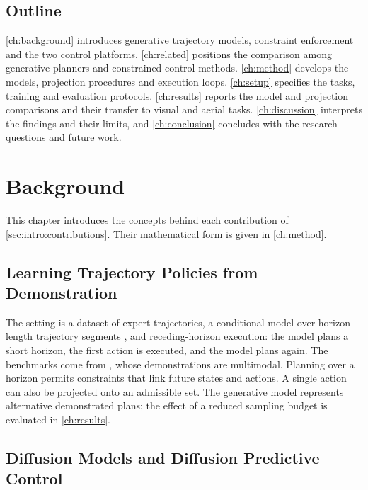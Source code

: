 \documentclass[headsepline,footsepline,footinclude=false,oneside,fontsize=11pt,paper=a4,listof=totoc,bibliography=totoc]{scrbook}
\theoremstyle{definition}
\theoremstyle{plain}
\theoremstyle{remark}
\begin{document}
\section{Outline}\label{sec:intro:outline}

\autoref{ch:background} introduces generative trajectory models, constraint enforcement and the two
control platforms. \autoref{ch:related} positions the comparison among generative planners and
constrained control methods. \autoref{ch:method} develops the models, projection procedures and
execution loops. \autoref{ch:setup} specifies the tasks, training and evaluation protocols.
\autoref{ch:results} reports the model and projection comparisons and their transfer to visual and
aerial tasks. \autoref{ch:discussion} interprets the findings and their limits, and
\autoref{ch:conclusion} concludes with the research questions and future work.

\chapter{Background}\label{ch:background}

This chapter introduces the concepts behind each contribution of \autoref{sec:intro:contributions}.
Their mathematical form is given in \autoref{ch:method}.

\section{Learning Trajectory Policies from Demonstration}\label{sec:bg:il}

The setting is a dataset of expert trajectories, a conditional model over horizon-length
trajectory segments \parencite{janner2022planning,chi2023diffusion}, and receding-horizon
execution: the model plans a short horizon, the first action is executed, and the model plans again.
The benchmarks come from \parencite{jia2024towards}, whose demonstrations are multimodal. Planning
over a horizon permits constraints that link future states and actions. A single action can also be
projected onto an admissible set. The generative model represents alternative demonstrated plans;
the effect of a reduced sampling budget is evaluated in \autoref{ch:results}.

\section{Diffusion Models and Diffusion Predictive Control}\label{sec:bg:diffusion}
\end{document}
